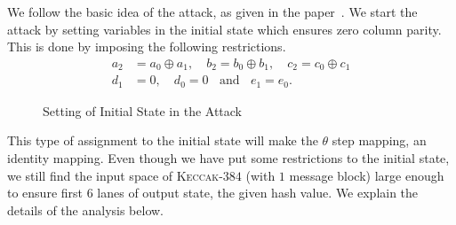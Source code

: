 \documentclass[runningheads]{llncs}
\newcommand{\Keccak}{\mbox{\textsc{Keccak}}}
\begin{document}
We follow the basic idea of the attack, as given in the paper~\cite{naya2011practical}.
We start the attack by setting variables in the initial state which ensures zero column parity. 
This is done by imposing the following restrictions.
\begin{align}\nonumber
a_2 &= a_0 \oplus a_1,\quad b_2 = b_0 \oplus b_1, \quad c_2 = c_0 \oplus c_1\\ \label{cond_state1}
d_1 & = 0,\quad d_0 = 0\;\;\text{ and }\;\; e_1 = e_0. 
\end{align}

\begin{figure}
\begin{center}
\end{center}
\caption{Setting of Initial State in the Attack\label{initial_state}}
\end{figure}
This type of assignment to the initial state will make the {$\theta$} step mapping, an identity mapping. Even though we have put some restrictions to the initial state, we still find the input space of \Keccak-$384$ (with $1$ message block) large enough to ensure first $6$ lanes of output state, the given hash value. We explain the details of the analysis below. 
\end{document}
